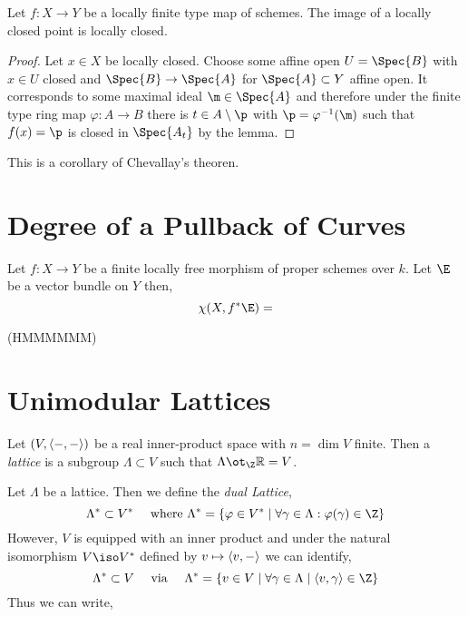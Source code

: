 \documentclass[12pt]{article}
\begin{document}
\begin{prop}
Let $f : X \to Y$ be a locally finite type map of schemes. The image of a locally closed point is locally closed.
\end{prop}

\begin{proof}
Let $x \in X$ be locally closed. Choose some affine open $U = \Spec{B}$ with $x \in U$ closed and $\Spec{B} \to \Spec{A}$ for $\Spec{A} \subset Y$ affine open. It corresponds to some maximal ideal $\m \in \Spec{A}$ and therefore under the finite type ring map $\varphi : A \to B$ there is $t \in A \setminus \p$ with $\p = \varphi^{-1}(\m)$ such that $f(x) = \p$ is closed in $\Spec{A_t}$ by the lemma.
\end{proof}

\begin{rmk}
This is a corollary of Chevallay's theoren. 
\end{rmk}

\section{Degree of a Pullback of Curves}

\begin{prop}
Let $f : X \to Y$ be a finite locally free morphism of proper schemes over $k$. Let $\E$ be a vector bundle on $Y$ then,
\[ \chi(X, f^* \E) = \]  
\end{prop}
(HMMMMMM)

\section{Unimodular Lattices}

\begin{defn}
Let $(V, \left< -, - \right>)$ be a real inner-product space with $n = \dim{V}$ finite. Then a \textit{lattice} is a subgroup $\Lambda \subset V$ such that $\Lambda \ot_{\Z} \R = V$.  
\end{defn}

\begin{defn}
Let $\Lambda$ be a lattice. Then we define the \textit{dual Lattice},
\[ \Lambda^* \subset V^* \quad \text{ where } \Lambda^* = \{ \varphi \in V^* \mid \forall \gamma \in \Lambda : \varphi(\gamma) \in \Z \} \]
However, $V$ is equipped with an inner product and under the natural isomorphism $V \iso V^*$ defined by $v \mapsto \left< v, - \right>$ we can identify,
\[ \Lambda^* \subset V \quad \text{ via } \quad \Lambda^* = \{ v \in V \mid \forall \gamma \in \Lambda \mid \inner{v}{\gamma} \in \Z \} \]
Thus we can write,
\begin{center}
\end{center}
\end{defn}
\end{document}
